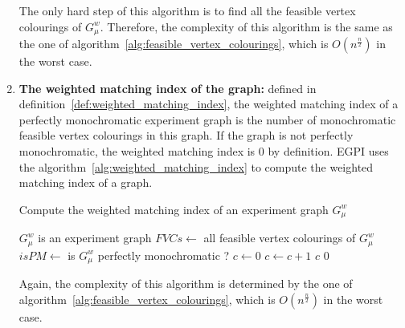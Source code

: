 \begin{enumerate}
        The only hard step of this algorithm is to find all the feasible vertex colourings of $G_\mu^w$.
        Therefore, the complexity of this algorithm is the same as the one of algorithm~\ref{alg:feasible_vertex_colourings}, which is $O\left(n^\frac{n}{2}\right)$ in the worst case.

    \item \textbf{The weighted matching index of the graph:} defined in definition~\ref{def:weighted_matching_index}, the weighted matching index of a perfectly monochromatic experiment graph is the number of monochromatic feasible vertex colourings in this graph.
        If the graph is not perfectly monochromatic, the weighted matching index is $0$ by definition.
        EGPI uses the algorithm~\ref{alg:weighted_matching_index} to compute the weighted matching index of a graph.
        \begin{algorithm}
            \caption{Compute the weighted matching index of an experiment graph $G_\mu^w$}
            \label{alg:weighted_matching_index}
            \begin{algorithmic}
                \Require $G_\mu^w$ is an experiment graph
                \State $FVCs \gets$ all feasible vertex colourings of $G_\mu^w$
                \State $isPM \gets$ is $G_\mu^w$ perfectly monochromatic ?
                    \State $c \gets 0$
                            \State $c \gets c + 1$
                        \EndIf
                    \EndFor
                    \State \Return $c$
                \Else
                    \State \Return $0$
                \EndIf
            \end{algorithmic}
        \end{algorithm}

        Again, the complexity of this algorithm is determined by the one of algorithm~\ref{alg:feasible_vertex_colourings}, which is $O\left(n^\frac{n}{2}\right)$ in the worst case.


\end{enumerate}
